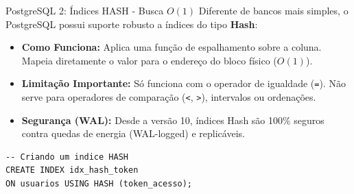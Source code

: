 \documentclass[9pt]{beamer}
\begin{document}
\begin{frame}[fragile]{PostgreSQL 2: Índices HASH - Busca $O(1)$}
    Diferente de bancos mais simples, o PostgreSQL possui suporte robusto a índices do tipo \textbf{Hash}:
    
    \vspace{0.2cm}
    \begin{itemize}
        \item \textbf{Como Funciona:} Aplica uma função de espalhamento sobre a coluna. Mapeia diretamente o valor para o endereço do bloco físico ($O(1)$).
        \item \textbf{Limitação Importante:} Só funciona com o operador de igualdade (\texttt{=}). Não serve para operadores de comparação (\texttt{<}, \texttt{>}), intervalos ou ordenações.
        \item \textbf{Segurança (WAL):} Desde a versão 10, índices Hash são 100\% seguros contra quedas de energia (WAL-logged) e replicáveis.
    \end{itemize}
    
    \vspace{0.2cm}
    \begin{lstlisting}[basicstyle=\ttfamily\scriptsize]
-- Criando um indice HASH
CREATE INDEX idx_hash_token 
ON usuarios USING HASH (token_acesso);
    \end{lstlisting}
\end{frame}
\end{document}
